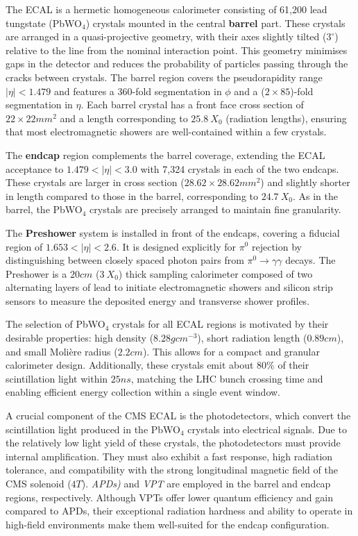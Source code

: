 The \ac{ECAL} is a hermetic homogeneous calorimeter consisting of 61,200 lead tungstate (PbWO$_4$) crystals mounted in the central \textbf{barrel} part. These crystals are arranged in a quasi-projective geometry, with their axes slightly tilted ($3^\circ$) relative to the line from the nominal interaction point. This geometry minimises gaps in the detector and reduces the probability of particles passing through the cracks between crystals. The barrel region covers the pseudorapidity range $|\eta| < 1.479$ and features a 360-fold segmentation in $\phi$ and a ($2 \times 85$)-fold segmentation in $\eta$. Each barrel crystal has a front face cross section of $22 \times 22\unit{mm}^2$ and a length corresponding to $25.8~X_0$ (radiation lengths), ensuring that most electromagnetic showers are well-contained within a few crystals.

The \textbf{endcap} region complements the barrel coverage, extending the \ac{ECAL} acceptance to $1.479 < |\eta| < 3.0$ with 7,324 crystals in each of the two endcaps. These crystals are larger in cross section ($28.62 \times 28.62\unit{mm}^2$) and slightly shorter in length compared to those in the barrel, corresponding to $24.7~X_0$. As in the barrel, the PbWO$_4$ crystals are precisely arranged to maintain fine granularity.

The \textbf{Preshower} system is installed in front of the endcaps, covering a fiducial region of $1.653 < |\eta| < 2.6$. It is designed explicitly for $\pi^0$ rejection by distinguishing between closely spaced photon pairs from $\pi^0 \to \gamma \gamma$ decays. The Preshower is a $20\unit{cm}$ ($3~X_0$) thick sampling calorimeter composed of two alternating layers of lead to initiate electromagnetic showers and silicon strip sensors to measure the deposited energy and transverse shower profiles.

The selection of PbWO$_4$ crystals for all \ac{ECAL} regions is motivated by their desirable properties: high density ($8.28\unit{gcm}^{-3}$), short radiation length ($0.89\unit{cm}$), and small Moli\`ere radius ($2.2\unit{cm}$). This allows for a compact and granular calorimeter design. Additionally, these crystals emit about 80\% of their scintillation light within $25\unit{ns}$, matching the \ac{LHC} bunch crossing time and enabling efficient energy collection within a single event window.

A crucial component of the \ac{CMS} \ac{ECAL} is the photodetectors, which convert the scintillation light produced in the PbWO$_4$ crystals into electrical signals. Due to the relatively low light yield of these crystals, the photodetectors must provide internal amplification. They must also exhibit a fast response, high radiation tolerance, and compatibility with the strong longitudinal magnetic field of the \ac{CMS} solenoid ($4\unit{T}$). \textit{\acp{APD})} and \textit{\ac{VPT}} are employed in the barrel and endcap regions, respectively. Although \acp{VPT} offer lower quantum efficiency and gain compared to \acp{APD}, their exceptional radiation hardness and ability to operate in high-field environments make them well-suited for the endcap configuration.

